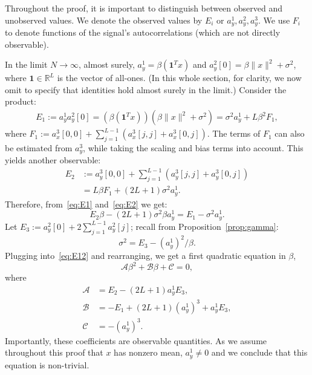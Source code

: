\documentclass[12pt]{article}
\newcommand{\1}{\mathbf{1}}
\newcommand{\RL}{\mathbb{R}^L}
\newcommand{\one}{\mathbf{1}}
\theoremstyle{plain}
\theoremstyle{definition}
\theoremstyle{remark}
\theoremstyle{plain}
\theoremstyle{remark}
\theoremstyle{plain}
\theoremstyle{plain}
\theoremstyle{plain}
\numberwithin{equation}{section}
\begin{document}
Throughout the proof, it is important to distinguish between observed and unobserved values.
We denote the observed values by $E_i$ or $a_y^1,a_y^2,a_y^3$. We use $F_i$ to denote functions of the signal's autocorrelations (which are not directly observable).

In the limit $N \to \infty$, almost surely, $a_y^1 = \beta(\one^Tx)$ and $a_y^2[0] = \beta\|x\|^2+\sigma^2$, where $\one\in\RL$ is the vector of all-ones. (In this whole section, for clarity, we now omit to specify that identities hold almost surely in the limit.) Consider the product:
\begin{equation}\label{eq:E1}
\begin{split}
E_1 := a_y^1a_y^2[0] =  (\beta(\one^Tx))(\beta\|x\|^2+\sigma^2)  = \sigma^2a_y^1 + L\beta^2F_1,
\end{split}
\end{equation}
where $F_1 := a_x^3[0,0] + \sum_{j=1}^{L-1}(a_x^3[j,j] + a_x^3[0,j])$. 
The terms of $F_1$ can also be estimated from $a_y^3$, while taking the scaling and bias terms into account. This yields another observable:
\begin{align} 
E_2 & := a_y^3[0,0] + \sum_{j=1}^{L-1}(a_y^3[j,j] + a_y^3[0,j]) \nonumber\\
& = L\beta F_1 + (2L+1)\sigma^2a_y^1. \label{eq:E2}
\end{align}
Therefore, from~\eqref{eq:E1} and~\eqref{eq:E2} we get:
\begin{equation} \label{eq:E12}
E_2\beta -(2L+1)\sigma^2\beta a_y^1 = E_1-\sigma^2a_y^1.
\end{equation}
Let $E_3:=a_y^2[0] + 2\sum_{j = 1}^{L-1}a_y^2[j]$; recall from Proposition~\ref{prop:gamma}:
\begin{equation} \label{eq:sigma2}
\sigma^2 = E_3 - (a^1_y)^2/\beta. 
\end{equation} 
Plugging into~\eqref{eq:E12} and rearranging, we get a first quadratic equation in $\beta$,
\begin{equation} \label{eq:quad1}
\mathcal{A}\beta^2 + \mathcal{B}\beta + \mathcal{C} = 0,
\end{equation}
where 
\begin{align*}
\mathcal{A} &= E_2 - (2L+1)a_y^1E_3, \\ 
\mathcal{B} &= -E_1 + (2L+1)(a_y^1)^3 + a_y^1E_3  , \\
\mathcal{C} &= -(a_y^1)^3.
\end{align*}
Importantly, these coefficients are observable quantities. As we assume throughout this proof that $x$ has nonzero mean, $a_y^1 \neq 0$ and we conclude that this equation is non-trivial.
\end{document}
